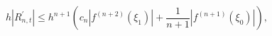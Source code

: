 \[h\left|R^{\prime}_{n,t}\right|\leq h^{n+1}\left(c_{n}\left|f^{(n+2)}(\xi_{1})%
\right|+\frac{1}{n+1}\left|f^{(n+1)}(\xi_{0})\right|\right),\]